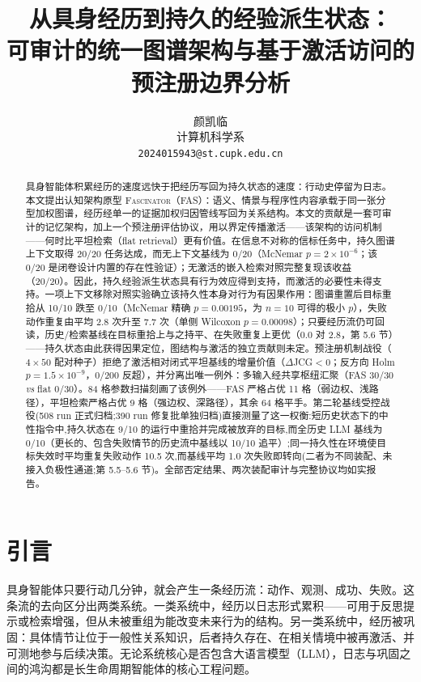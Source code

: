 \documentclass[10pt,a4paper]{ctexart}
\title{\bfseries 从具身经历到持久的经验派生状态：\\
可审计的统一图谱架构与基于激活访问的\\
预注册边界分析}
\author{颜凯临\\ \small 计算机科学系\\ \small \texttt{2024015943@st.cupk.edu.cn}}
\date{}
\begin{document}
\maketitle

\begin{abstract}
具身智能体积累经历的速度远快于把经历写回为持久状态的速度：行动史停留为日志。本文提出认知架构原型 \textsc{Fascinator}（FAS）：语义、情景与程序性内容承载于同一张分型加权图谱，经历经单一的证据加权归因管线写回为关系结构。本文的贡献是一套可审计的记忆架构，加上一个预注册评估协议，用以界定传播激活——该架构的访问机制——何时比平坦检索（flat retrieval）更有价值。在信息不对称的信标任务中，持久图谱上下文取得 20/20 任务达成，而无上下文基线为 0/20（McNemar $p{=}2\times10^{-6}$；该 0/20 是闭卷设计内置的存在性验证）；无激活的嵌入检索对照完整复现该收益（20/20）。因此，持久经验派生状态具有行为效应得到支持，而激活的必要性未得支持。一项上下文移除对照实验确立该持久性本身对行为有因果作用：图谱重置后目标重拾从 10/10 跌至 0/10（McNemar 精确 $p{=}0.00195$，为 $n{=}10$ 可得的极小 $p$），失败动作重复由平均 2.8 次升至 7.7 次（单侧 Wilcoxon $p{=}0.00098$）；只要经历流仍可回读，历史/检索基线在目标重拾上与之持平、在失败重复上更优（0.0 对 2.8，第 5.6 节）——持久状态由此获得因果定位，图结构与激活的独立贡献则未定。预注册机制战役（$4\times50$ 配对种子）拒绝了激活相对闭式平坦基线的增量价值（$\Delta$JCG${<}0$；反方向 Holm $p{=}1.5\times10^{-9}$，0/200 反超），并分离出唯一例外：多输入经共享枢纽汇聚（FAS 30/30 \emph{vs} flat 0/30）。84 格参数扫描刻画了该例外——FAS 严格占优 11 格（弱边权、浅路径），平坦检索严格占优 9 格（强边权、深路径），其余 64 格平手。第二轮基线受控战役(508 run 正式归档;390 run 修复批单独归档)直接测量了这一权衡:短历史状态下的中性指令中,持久状态在 9/10 的运行中重拾并完成被放弃的目标,而全历史 LLM 基线为 0/10（更长的、包含失败情节的历史流中基线以 10/10 追平）;同一持久性在环境使目标失效时平均重复失败动作 10.5 次,而基线平均 1.0 次失败即转向(二者为不同装配、未接入负极性通道;第 5.5--5.6 节)。全部否定结果、两次装配审计与完整协议均如实报告。
\end{abstract}

\section{引言}
\label{sec:intro}

具身智能体只要行动几分钟，就会产生一条经历流：动作、观测、成功、失败。这条流的去向区分出两类系统。一类系统中，经历以日志形式累积——可用于反思提示或检索增强，但从未被重组为能改变未来行为的结构。另一类系统中，经历被巩固：具体情节让位于一般性关系知识，后者持久存在、在相关情境中被再激活、并可测地参与后续决策。无论系统核心是否包含大语言模型（LLM），日志与巩固之间的鸿沟都是长生命周期智能体的核心工程问题。
\end{document}
